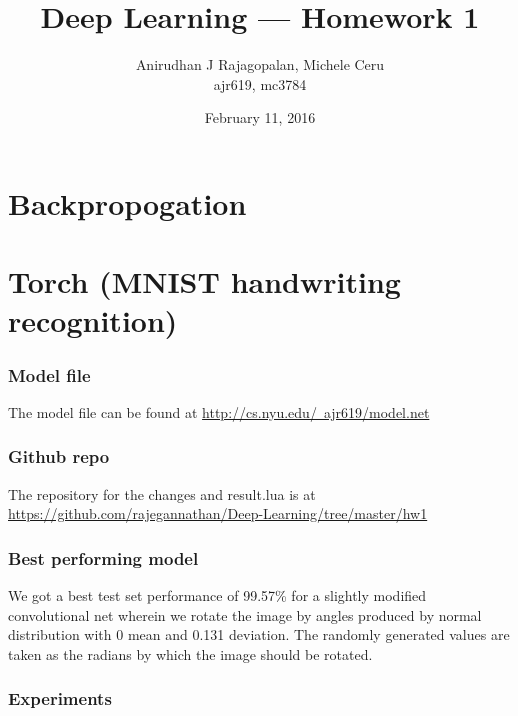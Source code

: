 \documentclass{article}
\begin{document}
\title{Deep Learning --- Homework 1}
\date{February 11, 2016}
\author{Anirudhan J Rajagopalan, Michele Ceru\\ ajr619, mc3784}

\maketitle

\newpage

\section[Expression for energy]{Backpropogation}

\section[Kaggle contest]{Torch (MNIST handwriting recognition)}

\subsubsection{Model file}
  The model file can be found at \href{http://cs.nyu.edu/~ajr619/model.net}{http://cs.nyu.edu/~ajr619/model.net}
\subsubsection{Github repo}
  The repository for the changes and result.lua is at \\
  \href{https://github.com/rajegannathan/Deep-Learning/tree/master/hw1}{https://github.com/rajegannathan/Deep-Learning/tree/master/hw1}
\subsubsection{Best performing model}
  We got a best test set performance of 99.57\% for a slightly modified convolutional net wherein we rotate the image by angles produced by normal distribution with 0 mean and 0.131 deviation.  The randomly generated values are taken as the radians by which the image should be rotated.
\subsubsection{Experiments}
\end{document}
